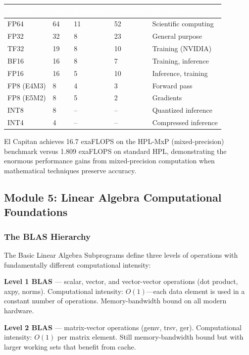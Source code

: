 \documentclass[11pt,letterpaper]{article}
\newcommand{\tableheader}[1]{\textbf{\sffamily\textcolor{white}{#1}}}
\begin{document}
\begin{center}
\begin{tabularx}{\textwidth}{L{1.5cm}C{2cm}C{2cm}C{2cm}X}
\toprule
{}
\tableheader{Format} & \tableheader{Bits} & \tableheader{Exponent} & \tableheader{Mantissa} & \tableheader{Use Case} \\
\midrule
FP64 & 64 & 11 & 52 & Scientific computing \\
FP32 & 32 & 8 & 23 & General purpose \\
TF32 & 19 & 8 & 10 & Training (NVIDIA) \\
BF16 & 16 & 8 & 7 & Training, inference \\
FP16 & 16 & 5 & 10 & Inference, training \\
FP8 (E4M3) & 8 & 4 & 3 & Forward pass \\
FP8 (E5M2) & 8 & 5 & 2 & Gradients \\
INT8 & 8 & -- & -- & Quantized inference \\
INT4 & 4 & -- & -- & Compressed inference \\
\bottomrule
\end{tabularx}
\end{center}

El Capitan achieves 16.7 exaFLOPS on the HPL-MxP (mixed-precision) benchmark versus 1.809 exaFLOPS on standard HPL, demonstrating the enormous performance gains from mixed-precision computation when mathematical techniques preserve accuracy.

\subsection{Module 5: Linear Algebra Computational Foundations}

\subsubsection{The BLAS Hierarchy}

The Basic Linear Algebra Subprograms define three levels of operations with fundamentally different computational intensity:

\textbf{Level 1 BLAS} --- scalar, vector, and vector-vector operations (dot product, axpy, norms). Computational intensity: $O(1)$---each data element is used in a constant number of operations. Memory-bandwidth bound on all modern hardware.

\textbf{Level 2 BLAS} --- matrix-vector operations (gemv, trsv, ger). Computational intensity: $O(1)$ per matrix element. Still memory-bandwidth bound but with larger working sets that benefit from cache.
\end{document}

